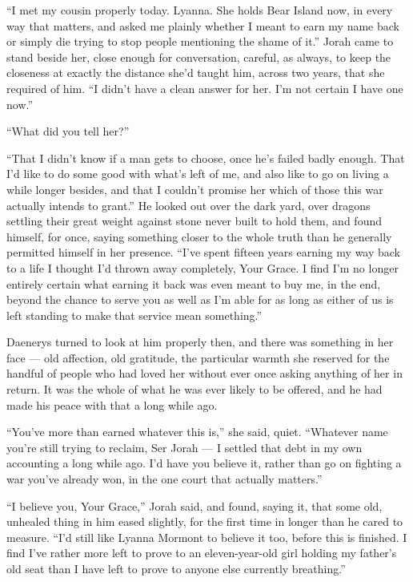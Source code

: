 “I met my cousin properly today. Lyanna. She holds Bear Island now, in every way that matters, and asked me plainly whether I meant to earn my name back or simply die trying to stop people mentioning the shame of it.” Jorah came to stand beside her, close enough for conversation, careful, as always, to keep the closeness at exactly the distance she’d taught him, across two years, that she required of him. “I didn’t have a clean answer for her. I’m not certain I have one now.”

“What did you tell her?”

“That I didn’t know if a man gets to choose, once he’s failed badly enough. That I’d like to do some good with what’s left of me, and also like to go on living a while longer besides, and that I couldn’t promise her which of those this war actually intends to grant.” He looked out over the dark yard, over dragons settling their great weight against stone never built to hold them, and found himself, for once, saying something closer to the whole truth than he generally permitted himself in her presence. “I’ve spent fifteen years earning my way back to a life I thought I’d thrown away completely, Your Grace. I find I’m no longer entirely certain what earning it back was even meant to buy me, in the end, beyond the chance to serve you as well as I’m able for as long as either of us is left standing to make that service mean something.”

Daenerys turned to look at him properly then, and there was something in her face — old affection, old gratitude, the particular warmth she reserved for the handful of people who had loved her without ever once asking anything of her in return. It was the whole of what he was ever likely to be offered, and he had made his peace with that a long while ago.

“You’ve more than earned whatever this is,” she said, quiet. “Whatever name you’re still trying to reclaim, Ser Jorah — I settled that debt in my own accounting a long while ago. I’d have you believe it, rather than go on fighting a war you’ve already won, in the one court that actually matters.”

“I believe you, Your Grace,” Jorah said, and found, saying it, that some old, unhealed thing in him eased slightly, for the first time in longer than he cared to measure. “I’d still like Lyanna Mormont to believe it too, before this is finished. I find I’ve rather more left to prove to an eleven-year-old girl holding my father’s old seat than I have left to prove to anyone else currently breathing.”

